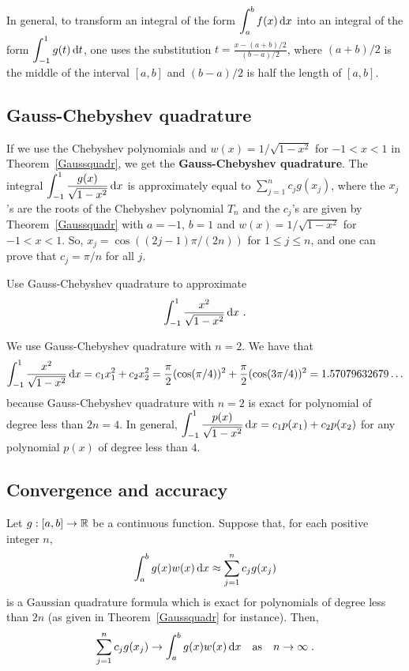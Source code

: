 \begin{rmk}
In general, to transform an integral of the form
$\displaystyle \int_a^b f(x) \,\mathrm{d}x$ into an integral of the form
$\displaystyle \int_{-1}^1 g(t) \,\mathrm{d}t$, one uses the substitution
$\displaystyle t = \frac{x - (a+b)/2}{(b-a)/2}$,
where $(a+b)/2$ is the middle of the interval $[a,b]$ and
$(b-a)/2$ is half the length of $[a,b]$.
\end{rmk}

\subsection{Gauss-Chebyshev quadrature}

If we use the Chebyshev polynomials and $w(x) = 1/\sqrt{1-x^2}$ for
$-1<x<1$ in Theorem~\ref{Gaussquadr}, we get the
{\bfseries Gauss-Chebyshev quadrature}.  The integral 
$\displaystyle \int_{-1}^1 \frac{g(x)}{\sqrt{1-x^2}}\,\mathrm{d}x$ is
approximately equal to $\displaystyle \sum_{j=1}^n c_j g(x_j)$, where the
$x_j$'s are the roots of the Chebyshev polynomial $T_n$ and the
$c_j$'s are given by Theorem~\ref{Gaussquadr} with $a = -1$, $b=1$ and
$w(x) = 1/\sqrt{1-x^2}$ for $-1<x<1$.  So, 
$x_j= \cos((2j-1)\pi/(2n))$ for $1 \leq j \leq n$, and one can prove that
$c_j = \pi/n$ for all $j$.

\begin{egg}
Use Gauss-Chebyshev quadrature to approximate
\[
\int_{-1}^1 \frac{x^2}{\sqrt{1-x^2}}\dx{x}\ .
\]

We use Gauss-Chebyshev quadrature with $n=2$.  We have that
\[
\int_{-1}^1 \frac{x^2}{\sqrt{1-x^2}}\,\mathrm{d}x
= c_1 x_1^2 + c_2 x_2^2
= \frac{\pi}{2}(\cos(\pi/4))^2 + \frac{\pi}{2}(\cos(3\pi/4))^2
= 1.57079632679\ldots
\]
because Gauss-Chebyshev quadrature with $n=2$ is exact for polynomial
of degree less than $2n = 4$.  In general,
$\displaystyle \int_{-1}^1 \frac{p(x)}{\sqrt{1-x^2}}\,\mathrm{d}x
= c_1 p(x_1) + c_2 p(x_2)$
for any polynomial $p(x)$ of degree less than $4$.
\end{egg}

\subsection{Convergence and accuracy}

\begin{theorem}
Let $g:[a,b]\rightarrow \mathbb{R}$ be a continuous function.  Suppose that,
for each positive integer $n$,
\[
\int_a^b g(x) w(x)\,\mathrm{d}x \approx \sum_{j=1}^n c_j g(x_j) 
\]
is a Gaussian quadrature formula which is exact for polynomials of
degree less than $2n$ (as given in Theorem~\ref{Gaussquadr} for
instance).  Then,
\[
\sum_{j=1}^n c_j g(x_j)  \rightarrow \int_a^b g(x) w(x)\,\mathrm{d}x \quad 
\text{as} \quad n\rightarrow \infty \; .
\]
\end{theorem}

